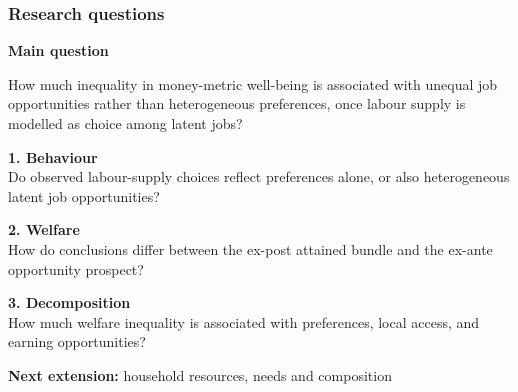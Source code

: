 \documentclass[10pt,aspectratio=169]{beamer}
\begin{document}
\begin{frame}[t]
\frametitle{Research questions}
\small

\begin{center}
\normalsize
\textbf{Main question}
\end{center}

\begin{block}{}
How much inequality in money-metric well-being is associated with
unequal job opportunities rather than heterogeneous preferences,
once labour supply is modelled as choice among latent jobs?
\end{block}

\vspace{0.4em}

\textbf{1. Behaviour}\\[-0.1em]
{\footnotesize
Do observed labour-supply choices reflect preferences alone,
or also heterogeneous latent job opportunities?
}

\vspace{0.45em}

\textbf{2. Welfare}\\[-0.1em]
{\footnotesize
How do conclusions differ between the ex-post attained bundle
and the ex-ante opportunity prospect?
}

\vspace{0.45em}

\textbf{3. Decomposition}\\[-0.1em]
{\footnotesize
How much welfare inequality is associated with preferences,
local access, and earning opportunities?
}

\vspace{0.35em}

\begin{center}
\scriptsize
\textbf{Next extension:} household resources, needs and composition
\end{center}

\end{frame}


\end{document}
